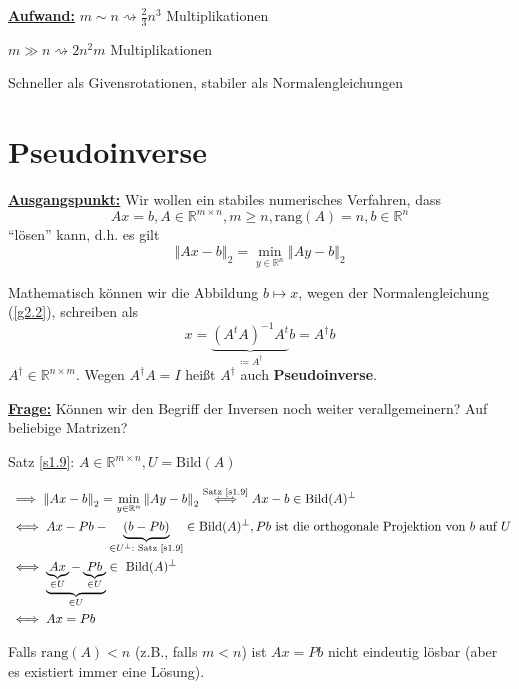 \documentclass{book}
\def\R{\mathbb{R}}
\def\rang{\text{rang}}
\begin{document}
            \underline{\textbf{Aufwand:}} $m\sim n \rightsquigarrow \frac{2}{3}n^3$ Multiplikationen

            $m\gg n \rightsquigarrow 2n^2m$ Multiplikationen

            Schneller als Givensrotationen, stabiler als Normalengleichungen

        \section{Pseudoinverse}

            \underline{\textbf{Ausgangspunkt:}} Wir wollen ein stabiles numerisches Verfahren, dass 
            \[
                Ax=b,A\in\R^{m\times n},m\geq n,\rang(A)=n,b\in\R^n    
            \]
            ``lösen'' kann, d.h. es gilt 
            \[
                \left\Vert Ax-b \right\Vert_2=\min_{y\in\R^n}\left\Vert Ay-b \right\Vert_2    
            \]

            Mathematisch können wir die Abbildung $b\mapsto x$, wegen der Normalengleichung (\ref{g2.2}), schreiben als 
            \[
                x=\underbrace{(A^tA)^{-1}A^t}_{\coloneqq A^\dagger}b=A^\dagger b    
            \]
            $A^\dagger\in\R^{n\times m}$. Wegen $A^\dagger A=I$ heißt $A^\dagger$ auch \textbf{Pseudoinverse}.

            \underline{\textbf{Frage:}} Können wir den Begriff der Inversen noch weiter verallgemeinern? Auf beliebige Matrizen?

            Satz \ref{s1.9}: $A\in\R^{m\times n}, U=\text{Bild}(A)$

            \begin{align*}
                &\implies \left\Vert Ax-b \right\Vert_2=\min_{y\in\R^n} \left\Vert Ay-b \right\Vert_2 \stackrel{\text{Satz \ref{s1.9}}}{\iff} Ax-b\in\text{Bild}(A)^\perp\\
                &\iff Ax- Pb -\underbrace{(b-Pb)}_{\in U^\perp:\text{ Satz \ref{s1.9}}}\in\text{Bild}(A)^\perp, Pb \text{ ist die orthogonale Projektion von } b \text{ auf } U\\
                &\iff \underbrace{\underbrace{Ax}_{\in U}-\underbrace{Pb}_{\in U}}_{\in U}\in\text{ Bild}(A)^\perp\\
                & \iff Ax=Pb
            \end{align*}

            Falls $\rang(A)<n$ (z.B., falls $m<n$) ist $Ax=Pb$ nicht eindeutig lösbar (aber es existiert immer eine Lösung).
\end{document}
